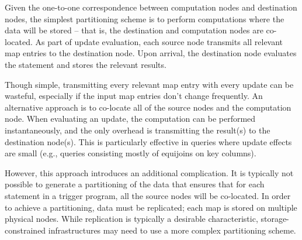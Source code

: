 Given the one-to-one correspondence between computation nodes and destination
nodes, the simplest partitioning scheme is to perform computations where the
data will be stored -- that is, the destination and computation nodes are
co-located.  As part of update evaluation, each source node transmits all
relevant map entries to the destination node.  Upon arrival, the destination
node evaluates the statement and stores the relevant results.

Though simple, transmitting every relevant map entry with every update can be
wasteful, especially if the input map entries don't change frequently.  An
alternative approach is to co-locate all of the source nodes and the computation
node.  When evaluating an update, the computation can be performed
instantaneously, and the only overhead is transmitting the result(s) to the
destination node(s).  This is particularly effective in queries where update
effects are small (e.g., queries consisting mostly of equijoins on key columns).

However, this approach introduces an additional complication.  It is typically
not possible to generate a partitioning of the data that ensures that for each
statement in a trigger program, all the source nodes will be co-located.  In
order to achieve a partitioning, data must be replicated; each map is stored on
multiple physical nodes.  While replication is typically a desirable
characteristic, storage-constrained infrastructures may need to use a more
complex partitioning scheme.

